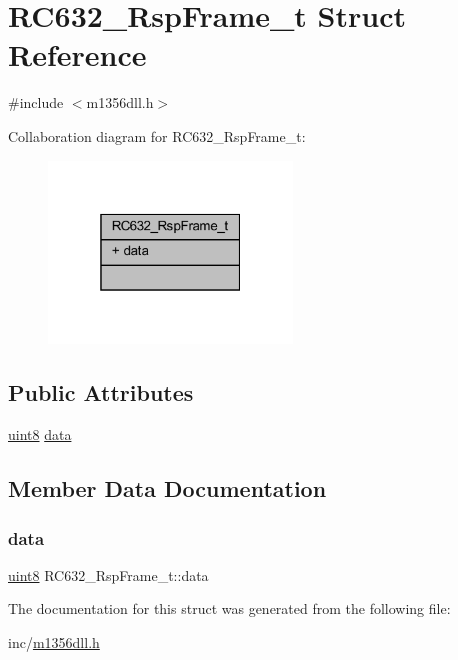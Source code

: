 \hypertarget{struct_r_c632___rsp_frame__t}{}\section{R\+C632\+\_\+\+Rsp\+Frame\+\_\+t Struct Reference}
\label{struct_r_c632___rsp_frame__t}


{\ttfamily \#include $<$m1356dll.\+h$>$}



Collaboration diagram for R\+C632\+\_\+\+Rsp\+Frame\+\_\+t\+:
\nopagebreak
\begin{figure}[H]
\begin{center}
\leavevmode
\includegraphics[width=184pt]{struct_r_c632___rsp_frame__t__coll__graph}
\end{center}
\end{figure}
\subsection*{Public Attributes}
\begin{DoxyCompactItemize}
\item 
\mbox{\hyperlink{m1356dll_8h_adde6aaee8457bee49c2a92621fe22b79}{uint8}} \mbox{\hyperlink{struct_r_c632___rsp_frame__t_a5e6973773f2011cc4f40de26b391c2a9}{data}}
\end{DoxyCompactItemize}


\subsection{Member Data Documentation}
\mbox{\label{struct_r_c632___rsp_frame__t_a5e6973773f2011cc4f40de26b391c2a9}} 
\subsubsection{\texorpdfstring{data}{data}}
{\footnotesize\ttfamily \mbox{\hyperlink{m1356dll_8h_adde6aaee8457bee49c2a92621fe22b79}{uint8}} R\+C632\+\_\+\+Rsp\+Frame\+\_\+t\+::data}



The documentation for this struct was generated from the following file\+:\begin{DoxyCompactItemize}
\item 
inc/\mbox{\hyperlink{m1356dll_8h}{m1356dll.\+h}}\end{DoxyCompactItemize}
